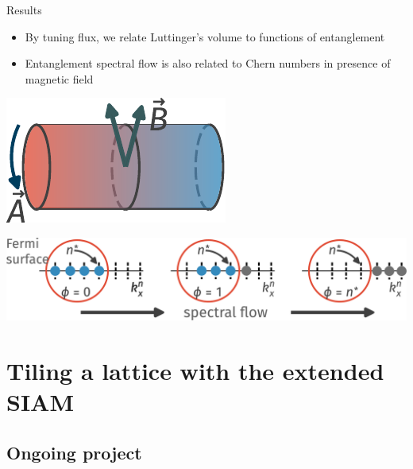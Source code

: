\documentclass[aspectratio=169]{beamer}
\begin{document}
\begin{frame}{Results}
\begin{minipage}{0.63\textwidth}
\begin{itemize}
	\item By tuning flux, we relate Luttinger's volume to functions of entanglement
	\item Entanglement spectral flow is also related to Chern numbers in presence of magnetic field
\end{itemize}
\end{minipage}
\hspace*{\fill}
\begin{minipage}{0.35\textwidth}
\includegraphics[width=\textwidth]{cylinder.pdf}
\end{minipage}

\vspace*{\fill}
\includegraphics[width=\textwidth]{spectral-flow.pdf}
\end{frame}

\section{Tiling a lattice with the extended SIAM}
\subsection{Ongoing project}
\end{document}

